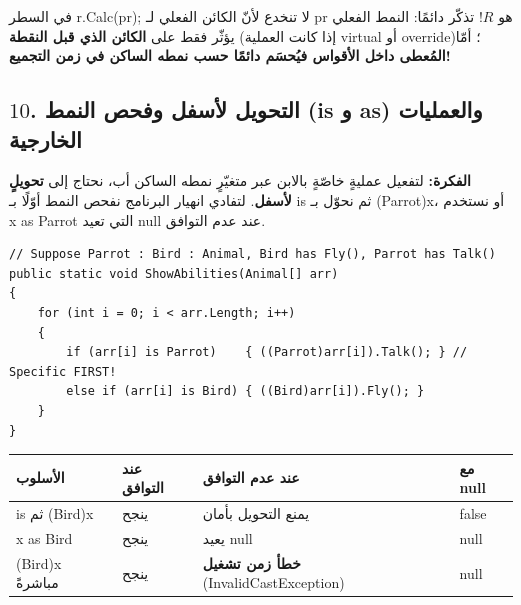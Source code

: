 \documentclass[14pt]{extarticle}
\begin{document}
\begin{boxWarning}
في السطر \textenglish{r.Calc(pr);} لا تنخدع لأنّ الكائن الفعلي لـ \textenglish{pr} هو $R$! تذكّر دائمًا: النمط الفعلي يؤثّر فقط على \textbf{الكائن الذي قبل النقطة} (إذا كانت العملية \textenglish{virtual} أو \textenglish{override})؛ أمّا \textbf{المُعطى داخل الأقواس فيُحسَم دائمًا حسب نمطه الساكن في زمن التجميع!}
\end{boxWarning}

\filbreak
\subsection*{$10$. التحويل لأسفل وفحص النمط (\textenglish{is} و \textenglish{as}) والعمليات الخارجية}
\textbf{الفكرة:} لتفعيل عمليةٍ خاصّةٍ بالابن عبر متغيّرٍ نمطه الساكن أب، نحتاج إلى \textbf{تحويلٍ لأسفل}. لتفادي انهيار البرنامج نفحص النمط أوّلًا بـ \textenglish{is} ثم نحوّل بـ \textenglish{(Parrot)x}، أو نستخدم \textenglish{x as Parrot} التي تعيد \textenglish{null} عند عدم التوافق.

\begin{boxCode}
\begin{english}
\begin{verbatim}
// Suppose Parrot : Bird : Animal, Bird has Fly(), Parrot has Talk()
public static void ShowAbilities(Animal[] arr)
{
    for (int i = 0; i < arr.Length; i++)
    {
        if (arr[i] is Parrot)    { ((Parrot)arr[i]).Talk(); } // Specific FIRST!
        else if (arr[i] is Bird) { ((Bird)arr[i]).Fly(); }
    }
}
\end{verbatim}
\end{english}
\end{boxCode}

{\renewcommand{\arraystretch}{1.15}
\small
\begin{longtable}{|C{0.22\textwidth}|C{0.18\textwidth}|C{0.28\textwidth}|C{0.16\textwidth}|}
\hline
\textbf{الأسلوب} & \textbf{عند التوافق} & \textbf{عند عدم التوافق} & \textbf{مع \textenglish{null}} \\
\hline
\textenglish{is} ثم \textenglish{(Bird)x} & ينجح & يمنع التحويل بأمان & \textenglish{false} \\
\hline
\textenglish{x as Bird} & ينجح & يعيد \textenglish{null} & \textenglish{null} \\
\hline
\textenglish{(Bird)x} مباشرةً & ينجح & \textbf{خطأ زمن تشغيل} (\textenglish{InvalidCastException}) & \textenglish{null} \\
\hline
\end{longtable}}
\end{document}
